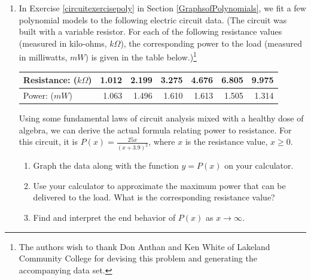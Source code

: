 \begin{enumerate}
\begin{enumerate}
\end{enumerate}

\item In Exercise \ref{circuitexercisepoly} in Section \ref{GraphsofPolynomials}, we fit a few polynomial models to the following electric circuit data. (The circuit was built with a variable resistor.  For each of the following resistance values (measured in kilo-ohms, $k \Omega$),  the corresponding power to the load (measured in milliwatts, $mW$) is given in the table below.)\footnote{The authors wish to thank Don Anthan and Ken White of Lakeland Community College for devising this problem and generating the accompanying data set.}


\smallskip

\noindent \begin{tabular}{|l|r|r|r|r|r|r|} \hline
Resistance: ($k \Omega$) & 1.012 & 2.199 & 3.275 & 4.676 & 6.805 & 9.975 \\ \hline
Power: ($mW$) & 1.063 & 1.496 & 1.610 & 1.613 & 1.505 & 1.314 \\ \hline
\end{tabular}

\smallskip

\noindent Using some fundamental laws of circuit analysis mixed with a healthy dose of algebra, we can derive the actual formula relating power to resistance.  For this circuit, it is $P(x) = \frac{25x}{(x + 3.9)^2}$, where $x$ is the resistance value, $x \geq 0$.

\begin{enumerate}

\item Graph the data along with the function $y = P(x)$ on your calculator.

\item Use your calculator to approximate the maximum power that can be delivered to the load.  What is the corresponding resistance value?

\item Find and interpret the end behavior of $P(x)$ as $x \rightarrow \infty$.

\end{enumerate}


\end{enumerate}
